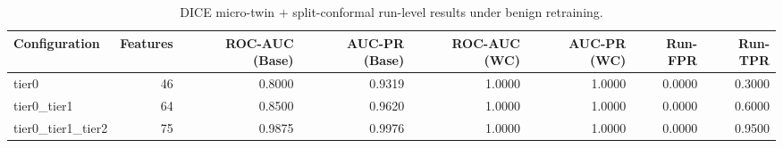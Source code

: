 \begin{table}[t]
\centering
\caption{DICE micro-twin + split-conformal run-level results under benign retraining.}
\label{tab:dice_full_overall}
\footnotesize
\begin{tabular}{lrrrrrrr}
\toprule
Configuration & Features & ROC-AUC (Base) & AUC-PR (Base) & ROC-AUC (WC) & AUC-PR (WC) & Run-FPR & Run-TPR \\
\midrule
tier0 & 46 & 0.8000 & 0.9319 & 1.0000 & 1.0000 & 0.0000 & 0.3000 \\
tier0_tier1 & 64 & 0.8500 & 0.9620 & 1.0000 & 1.0000 & 0.0000 & 0.6000 \\
tier0_tier1_tier2 & 75 & 0.9875 & 0.9976 & 1.0000 & 1.0000 & 0.0000 & 0.9500 \\
\bottomrule
\end{tabular}

\end{table}
